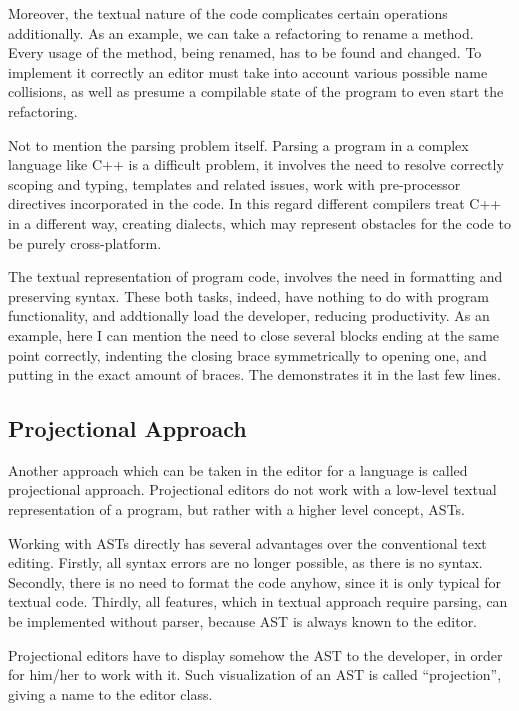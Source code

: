 Moreover, the textual nature of the code complicates certain operations additionally. As an example, we can take a refactoring
to rename a method. Every usage of the method, being renamed, has to be found and changed. To implement it correctly an editor
must take into account various possible name collisions, as well as presume a compilable state of the program to even start
the refactoring.

Not to mention the parsing problem itself. Parsing a program in a complex language like C++ is a difficult problem, it involves 
the need to resolve correctly scoping and typing, templates and related issues, work with pre-processor directives incorporated
in the code. In this regard different compilers treat C++ in a different way, creating dialects, which may represent obstacles for
the code to be purely cross-platform.


The textual representation of program code, involves the need in formatting and preserving syntax. These both tasks, indeed,  
have nothing to do with program functionality, and addtionally load the developer, reducing productivity. As an example, here
I can mention the need to close several blocks ending at the same point correctly, indenting the closing brace symmetrically 
to opening one, and putting in the exact amount of braces. The  demonstrates it in the last few lines.

\subsection{Projectional Approach}

Another approach which can be taken in the editor for a language is called projectional approach. Projectional editors
do not work with a low-level textual representation of a program, but rather with a higher level concept, ASTs.

Working with ASTs directly has several advantages over the conventional text editing. Firstly, all syntax errors are no longer
possible, as there is no syntax. Secondly, there is no need to format the code anyhow, since it is only typical for textual code.
Thirdly, all features, which in textual approach require parsing, can be implemented without parser, because AST is always known to the editor.

Projectional editors have to display somehow the AST to the developer, in order for him/her to work with it. Such visualization
of an AST is called ``projection'', giving a name to the editor class.


